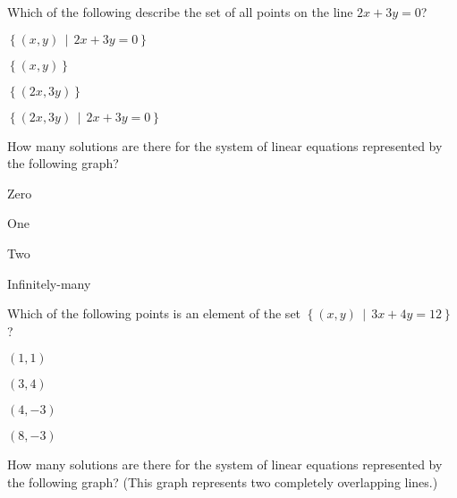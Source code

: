 \begin{readinessAssuranceTest}

\item Which of the following describe the set of all points on the line \(2x+3y=0\)?
\begin{multicols}{4}
\begin{readinessAssuranceTestChoices}
\item \(\displaystyle \left\{ (x,y) \,\middle|\, 2x+3y=0 \right\}\) %
\item \(\displaystyle \left\{ (x,y) \right\}\)
\item \(\displaystyle \left\{ (2x,3y) \right\}\)
\item \(\displaystyle \left\{ (2x,3y) \,\middle|\, 2x+3y=0 \right\}\)
\end{readinessAssuranceTestChoices}
\end{multicols}


\item How many solutions are there for the system of linear equations
      represented by the following graph?
    \begin{center}
      \systemWithOneSolutionB[0.23]
    \end{center}

\begin{multicols}{4}
\begin{readinessAssuranceTestChoices}
\item Zero
\item One %
\item Two
\item Infinitely-many
\end{readinessAssuranceTestChoices}
\end{multicols}

\item Which of the following points is an element of the set 
		\(\displaystyle \left\{ (x,y) \,\middle|\, 3x+4y=12 \right\}\) ?
\begin{multicols}{4}
\begin{readinessAssuranceTestChoices}
\item \( (1,1) \)
\item \( (3,4) \)
\item \( (4,-3) \)
\item \( (8,-3) \) %
\end{readinessAssuranceTestChoices}
\end{multicols}

\item How many solutions are there for the system of linear equations
      represented by the following graph? (This graph represents two completely
      overlapping lines.)
    \begin{center}
      \systemWithInfinitelyManySolutions
    \end{center}


\end{readinessAssuranceTest}

